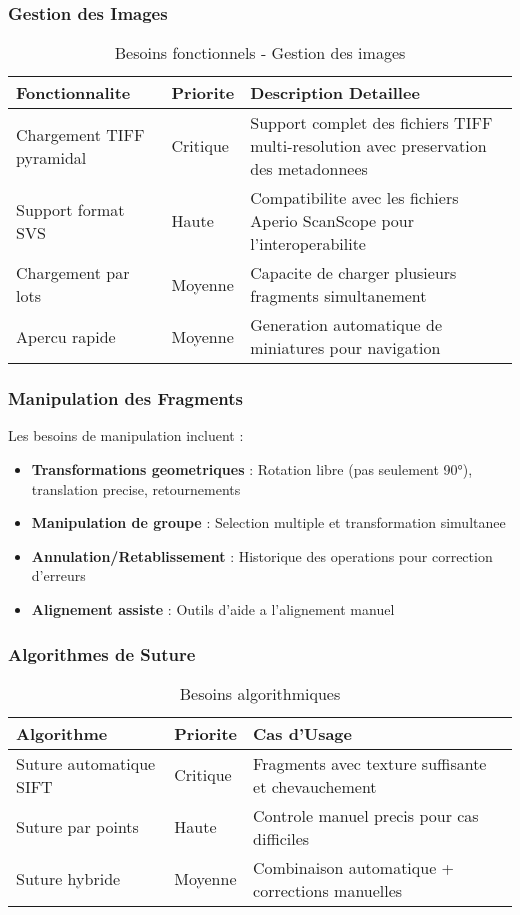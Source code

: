 \documentclass[12pt,a4paper]{article}
\begin{document}
\subsubsection{Gestion des Images}

\begin{table}[h]
\centering
\begin{tabular}{|p{4cm}|p{2cm}|p{6cm}|}
\hline
\textbf{Fonctionnalite} & \textbf{Priorite} & \textbf{Description Detaillee} \\
\hline
Chargement TIFF pyramidal & Critique & Support complet des fichiers TIFF multi-resolution avec preservation des metadonnees \\
\hline
Support format SVS & Haute & Compatibilite avec les fichiers Aperio ScanScope pour l'interoperabilite \\
\hline
Chargement par lots & Moyenne & Capacite de charger plusieurs fragments simultanement \\
\hline
Apercu rapide & Moyenne & Generation automatique de miniatures pour navigation \\
\hline
\end{tabular}
\caption{Besoins fonctionnels - Gestion des images}
\end{table}

\subsubsection{Manipulation des Fragments}

Les besoins de manipulation incluent :

\begin{itemize}
\item \textbf{Transformations geometriques} : Rotation libre (pas seulement 90°), translation precise, retournements
\item \textbf{Manipulation de groupe} : Selection multiple et transformation simultanee
\item \textbf{Annulation/Retablissement} : Historique des operations pour correction d'erreurs
\item \textbf{Alignement assiste} : Outils d'aide a l'alignement manuel
\end{itemize}

\subsubsection{Algorithmes de Suture}

\begin{table}[h]
\centering
\begin{tabular}{|p{4cm}|p{2cm}|p{6cm}|}
\hline
\textbf{Algorithme} & \textbf{Priorite} & \textbf{Cas d'Usage} \\
\hline
Suture automatique SIFT & Critique & Fragments avec texture suffisante et chevauchement \\
\hline
Suture par points & Haute & Controle manuel precis pour cas difficiles \\
\hline
Suture hybride & Moyenne & Combinaison automatique + corrections manuelles \\
\hline
\end{tabular}
\caption{Besoins algorithmiques}
\end{table}
\end{document}
